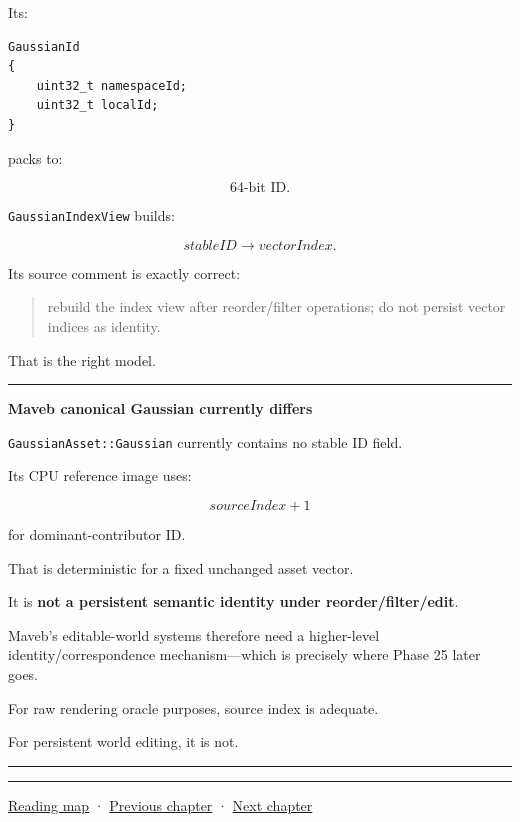 Its:

\protect{}\label{t7ceps}%
\begin{verbatim}
GaussianId
{
    uint32_t namespaceId;
    uint32_t localId;
}
\end{verbatim}

packs to:

\[
64\text{-bit ID}.
\]

\texttt{GaussianIndexView} builds:

\[
stableID\rightarrow vectorIndex.
\]

Its source comment is exactly correct:

\begin{quote}
rebuild the index view after reorder/filter operations; do not persist vector indices as identity.
\end{quote}

That is the right model.

\begin{center}\rule{0.5\linewidth}{0.5pt}\end{center}

\textbf{Maveb canonical Gaussian currently differs}

\texttt{GaussianAsset::Gaussian} currently contains no stable ID field.

Its CPU reference image uses:

\[
sourceIndex+1
\]

for dominant-contributor ID.

That is deterministic for a fixed unchanged asset vector.

It is \textbf{not a persistent semantic identity under reorder/filter/edit}.

Maveb's editable-world systems therefore need a higher-level identity/correspondence mechanism---which is precisely where Phase 25 later goes.

For raw rendering oracle purposes, source index is adequate.

For persistent world editing, it is not.

\begin{center}\rule{0.5\linewidth}{0.5pt}\end{center}

\begin{center}\rule{0.5\linewidth}{0.5pt}\end{center}

\hyperref[volume-reading-map]{Reading map} · \hyperref[04-visual-computing-ii-ch036-source-atlas-and-reconstruction-checkpoints]{Previous chapter} · \hyperref[04-visual-computing-ii-ch038-projecting-ellipsoids-into-screen-space-conics]{Next chapter}
